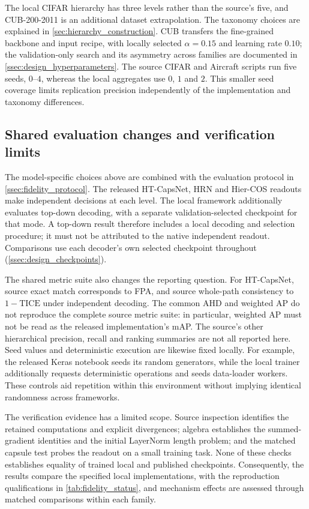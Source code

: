 The local CIFAR hierarchy has three levels rather than the source's five,
and CUB-200-2011 is an additional dataset extrapolation. The taxonomy choices
are explained in \cref{sec:hierarchy_construction}. CUB transfers the
fine-grained backbone and input recipe, with locally selected
$\alpha=0.15$ and learning rate $0.10$; the validation-only search and its
asymmetry across families are documented in
\cref{ssec:design_hyperparameters}. The source CIFAR and Aircraft scripts
run five seeds, $0$--$4$, whereas the local aggregates use $0$, $1$ and $2$.
This smaller seed coverage limits replication precision independently of the
implementation and taxonomy differences.

\subsection{Shared evaluation changes and verification limits}
\label{ssec:fidelity_verification}

The model-specific choices above are combined with the evaluation protocol in
\cref{ssec:fidelity_protocol}. The released HT-CapsNet, HRN and Hier-COS
readouts make independent decisions at each level. The local framework
additionally evaluates top-down decoding, with a separate validation-selected
checkpoint for that mode. A top-down result therefore includes a local
decoding and selection procedure; it must not be attributed to the native
independent readout. Comparisons use each decoder's own selected checkpoint
throughout (\cref{ssec:design_checkpoints}).

The shared metric suite also changes the reporting question. For HT-CapsNet,
source exact match corresponds to FPA, and source whole-path consistency to
$1-\mathrm{TICE}$ under independent decoding. The common AHD and weighted AP
do not reproduce the complete source metric suite: in particular, weighted AP
must not be read as the released implementation's mAP. The source's other
hierarchical precision, recall and ranking summaries are not all reported
here. Seed values and deterministic execution are likewise fixed locally.
For example, the released Keras notebook seeds its random generators, while
the local trainer additionally requests deterministic operations and seeds
data-loader workers. These controls aid repetition within this environment
without implying identical randomness across frameworks.

The verification evidence has a limited scope. Source inspection identifies
the retained computations and explicit divergences; algebra establishes the
summed-gradient identities and the initial LayerNorm length problem; and the
matched capsule test probes the readout on a small training task. None of these
checks establishes equality of trained local and published checkpoints.
Consequently, the results compare the specified local implementations, with
the reproduction qualifications in \cref{tab:fidelity_status}, and mechanism
effects are assessed through matched comparisons within each family.

